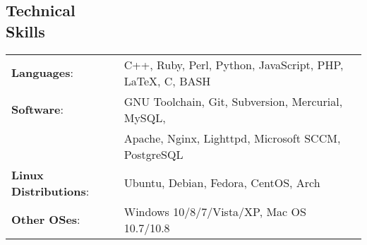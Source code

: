 \documentclass[margin]{res}
\begin{document}
\begin{resume}
    \section{Technical \\ Skills}
      \begin{tabular}{l p{3.6in}}
        \textbf{Languages}:                   & C++, Ruby, Perl, Python, JavaScript, PHP, \LaTeX, C, BASH \\ [1pt]
        \textbf{Software}:                    & GNU Toolchain, Git, Subversion, Mercurial, MySQL, \\
                                              & Apache, Nginx, Lighttpd, Microsoft SCCM, PostgreSQL \\ [1pt]
        \textbf{Linux Distributions}:         & Ubuntu, Debian, Fedora, CentOS, Arch \\ [1pt]
        \textbf{Other OSes}:                  & Windows 10/8/7/Vista/XP, Mac OS 10.7/10.8 \\ [1pt]
      \end{tabular}

  \end{resume} 
\end{document}
